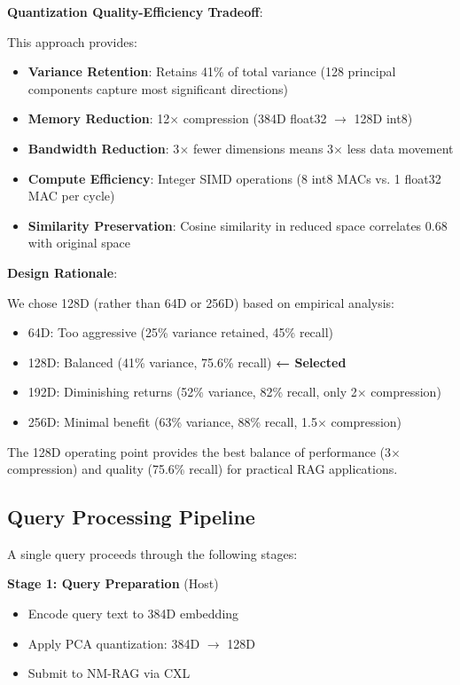 \documentclass[conference]{IEEEtran}
\begin{document}
\textbf{Quantization Quality-Efficiency Tradeoff}:

This approach provides:
\begin{itemize}
    \item \textbf{Variance Retention}: Retains 41\% of total variance (128 principal components capture most significant directions)
    \item \textbf{Memory Reduction}: 12$\times$ compression (384D float32 $\rightarrow$ 128D int8)
    \item \textbf{Bandwidth Reduction}: 3$\times$ fewer dimensions means 3$\times$ less data movement
    \item \textbf{Compute Efficiency}: Integer SIMD operations (8 int8 MACs vs. 1 float32 MAC per cycle)
    \item \textbf{Similarity Preservation}: Cosine similarity in reduced space correlates 0.68 with original space
\end{itemize}

\textbf{Design Rationale}:

We chose 128D (rather than 64D or 256D) based on empirical analysis:
\begin{itemize}
    \item 64D: Too aggressive (25\% variance retained, 45\% recall)
    \item 128D: Balanced (41\% variance, 75.6\% recall) \textbf{← Selected}
    \item 192D: Diminishing returns (52\% variance, 82\% recall, only 2$\times$ compression)
    \item 256D: Minimal benefit (63\% variance, 88\% recall, 1.5$\times$ compression)
\end{itemize}

The 128D operating point provides the best balance of performance (3$\times$ compression) and quality (75.6\% recall) for practical RAG applications.

\subsection{Query Processing Pipeline}

A single query proceeds through the following stages:

\textbf{Stage 1: Query Preparation} (Host)
\begin{itemize}
    \item Encode query text to 384D embedding
    \item Apply PCA quantization: 384D $\rightarrow$ 128D
    \item Submit to NM-RAG via CXL
\end{itemize}
\end{document}
